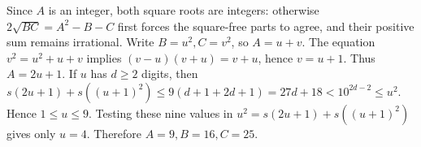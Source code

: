Since $A$ is an integer, both square roots are integers: otherwise $2\sqrt{BC}=A^2-B-C$ first forces the square-free parts to agree, and their positive sum remains irrational. Write $B=u^2,C=v^2$, so $A=u+v$. The equation $v^2=u^2+u+v$ implies $(v-u)(v+u)=v+u$, hence $v=u+1$. Thus $A=2u+1$. If $u$ has $d\ge2$ digits, then $s(2u+1)+s((u+1)^2)\le9(d+1+2d+1)=27d+18<10^{2d-2}\le u^2$. Hence $1\le u\le9$. Testing these nine values in $u^2=s(2u+1)+s((u+1)^2)$ gives only $u=4$. Therefore $\boxed{A=9,B=16,C=25}$.
